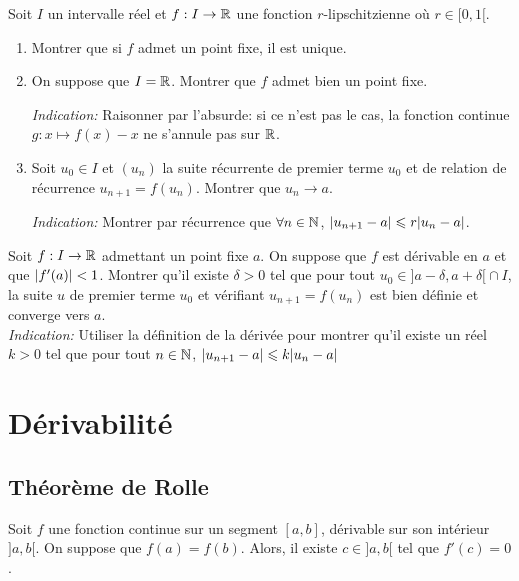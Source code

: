 \documentclass[../main.tex]{subfiles}
\begin{document}
\begin{exo}
    Soit $I$ un intervalle réel et $f:I\rightarrow\mathbb R$ une fonction $r$-lipschitzienne où $r\in{[0,1[}$. \begin{enumerate}
        \item Montrer que si $f$ admet un point fixe, il est unique.
		\item On suppose que $I=\mathbb R$. Montrer que $f$ admet bien un point fixe.\par
		\textit{Indication:} Raisonner par l'absurde: si ce n'est pas le cas, la fonction continue $g:x\longmapsto f(x)-x$ ne s'annule pas sur $\mathbb R$.
        \item Soit $u_0\in I$ et $(u_n)$ la suite récurrente de premier terme $u_0$ et de relation de récurrence $u_{n+1}=f(u_n)$. Montrer que $u_n\longrightarrow a$.\par
        \textit{Indication:} Montrer par récurrence que $\forall n\in\mathbb N$, $\lvert u_{n+1}-a\rvert\leqslant r\lvert u_n-a\rvert$.
    \end{enumerate} 
\end{exo}

\begin{exo}[TD]
Soit $f:I\rightarrow\mathbb R$ admettant un point fixe $a$. On suppose que $f$ est dérivable en $a$ et que $\lvert f'(a)\rvert<1$. Montrer qu'il existe $\delta>0$ tel que pour tout $u_0\in{]a-\delta,a+\delta[}\cap I$, la suite $u$ de premier terme $u_0$ et vérifiant $u_{n+1}=f(u_n)$ est bien définie et converge vers $a$.\\
\textit{Indication:} Utiliser la définition de la dérivée pour montrer qu'il existe un réel $k>0$ tel que pour tout $n\in\mathbb N$, $\lvert u_{n+1}-a\rvert\leqslant k\lvert u_n-a\rvert$
\end{exo}

\section{Dérivabilité}

\subsection{Théorème de Rolle}

\begin{thm}[de Rolle]
Soit $f$ une fonction continue sur un segment $[a,b]$, dérivable sur son intérieur $]a,b[$. On suppose que $f(a)=f(b)$. Alors, il existe $c\in{]a,b[}$ tel que $f'(c) = 0$.
\end{thm}
\end{document}
